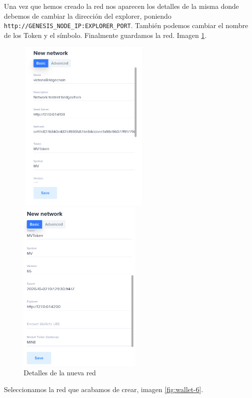 Una vez que hemos creado la red nos aparecen los detalles de la misma donde debemos de cambiar la dirección del explorer, poniendo \texttt{http://GENESIS\_NODE\_IP:EXPLORER\_PORT}. También podemos cambiar el nombre de los Token y el símbolo. Finalmente guardamos la red. Imagen \ref{fig:wallet-4-5}.

\begin{figure}[h]
	\centering
	\begin{minipage}{0.4\textwidth}
		\includegraphics[width=6.5cm,height=8.5cm]{figuras/wallet_4.png}
	\end{minipage}\hfill
	\begin{minipage}{0.4\textwidth}
		\includegraphics[width=6cm,height=8.5cm]{figuras/wallet_5.png}	
	\end{minipage}
	\caption{Detalles de la nueva red}
	\label{fig:wallet-4-5}
\end{figure}

Seleccionamos la red que acabamos de crear, imagen \ref{fig:wallet-6}.

